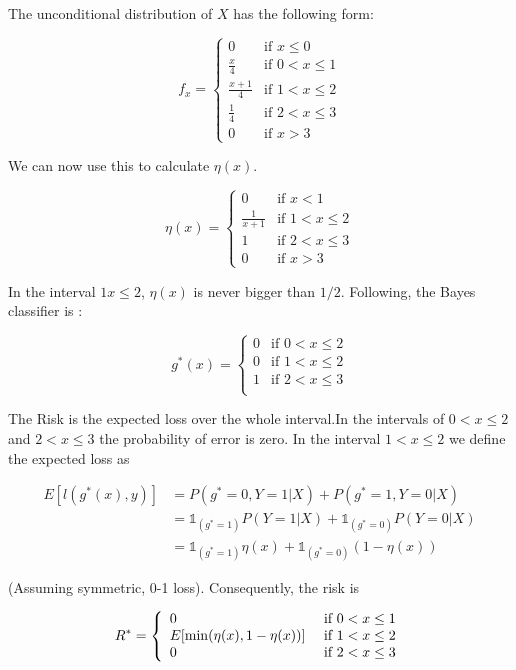 \documentclass[a4paper, 11pt]{article} %
\begin{document}
The unconditional distribution of $X$ has the following form:

$$f_x = \left\{ \begin{array}{ ll} {0} & {\text {if } x \leq 0} \\ 
{\frac{x}{4}} & {\text{if } 0 < x \leq 1  } \\
{\frac{x+1}{4}} & {\text {if } 1 < x \leq 2} \\
{\frac{1}{4}} & { \text {if } 2 < x \leq 3} \\
{0} & {\text {if } x > 3 } \end{array} \right. $$

We can now use this to calculate $\eta(x)$.

$$\eta(x) = \left\{ \begin{array}{ ll} {0} & {\text {if } x < 1} \\ 
{\frac{1}{x+1}} & {\text{if } 1 < x \leq 2  } \\
{1} & {\text{if } 2 < x \leq 3  } \\
{0} & {\text{if }  x > 3  }
\end{array} \right. $$

In the interval $1 x \leq 2$, $\eta(x)$ is never bigger than $1/2$. Following, the Bayes classifier is :

$$g^*(x) = \left\{ \begin{array}{ ll} {0} & {\text {if } 0 < x \leq 2} \\
{0} & {\text{if } 1 < x \leq 2 } \\
{1} & {\text{if } 2 < x \leq 3 } \\
\end{array} \right. $$

The Risk is the expected loss over the whole interval.In the intervals of $0 < x \leq 2$ and $2 < x \leq 3 $ the probability of error is zero. In the interval $1 < x \leq 2$ we define the expected loss as

\begin{align*}
E\left[l(g^*(x),y) \right]  &= P\left(g^*=0 , Y=1 | X\right) +  P\left(g^*=1 , Y=0 | X\right)\\
&= \mathbb{1}_{(g^*=1)} P\left(Y=1 | X\right) +\mathbb{1}_{(g^*=0)} P\left(Y=0 | X\right) \\
&= \mathbb{1}_{(g^*=1)} \eta(x) +\mathbb{1}_{(g^*=0)} (1-\eta(x))
\end{align*}

(Assuming symmetric, 0-1 loss). Consequently, the risk is 

$$R ^ { * } = \left\{ \begin{array} { l l } { 0 } & { \text { if } 0 < x \leq 1 } \\ {E [ \min ( \eta ( x ) , 1 - \eta ( x ) ) ] } & { \text { if } 1 < x \leq 2 } \\ { 0 } & { \text { if } 2 < x \leq 3 } \end{array} \right.$$
\end{document}
